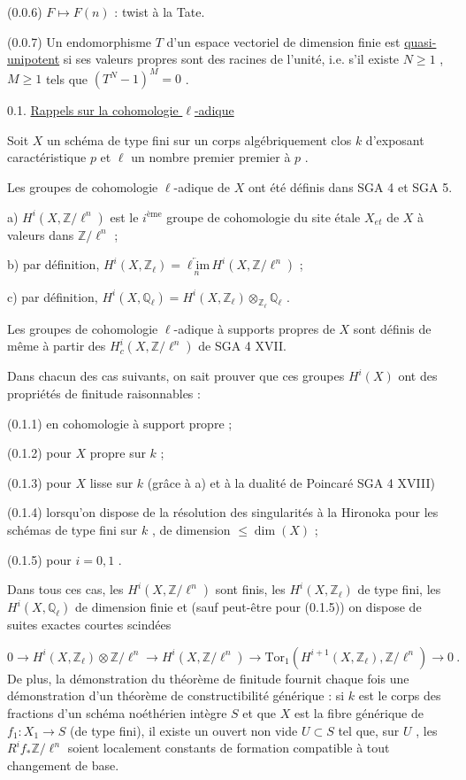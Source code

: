 (0.0.6)    $F \longmapsto F(n)$ : twist à la Tate.

(0.0.7)    Un endomorphisme  $T$  d'un espace vectoriel de dimension finie est \underline{quasi-unipotent} si ses valeurs propres sont des racines de l'unité, i.e. s'il existe $N \geqslant 1$ , $M \geqslant 1$  tels que $(T^N - 1)^M = 0$ .


0.1.  \underline{Rappels sur la cohomologie $\ell$-adique}

Soit  $X$  un schéma de type fini sur un corps algébriquement clos  $k$  d'exposant caractéristique  $p$  et  $\ell$  un nombre premier premier à  $p$ .

Les groupes de cohomologie $\ell$-adique de  $X$  ont été définis dans SGA 4 et SGA 5.

a) $H^i(X,\mathbb{Z}/\ell^n)$  est le $i^{\text{ème}}$ groupe de cohomologie du site étale  $X_{et}$  de  $X$  à valeurs dans  $\mathbb{Z}/\ell^n$ ;

b) par définition,  $H^i(X,\mathbb{Z}_\ell) = \underset{n}{\underleftarrow{\ell\mathrm{im}}}\, H^i(X,\mathbb{Z}/\ell^n)$  ;

c) par définition,  $H^i(X,\mathbb{Q}_\ell) = H^i(X,\mathbb{Z}_\ell) \otimes_{\mathbb{Z}_\ell} \mathbb{Q}_\ell$ .

Les groupes de cohomologie $\ell$-adique à supports propres de  $X$  sont définis de même à partir des  $H^i_c(X,\mathbb{Z}/\ell^n)$  de SGA 4 XVII.

Dans chacun des cas suivants, on sait prouver que ces groupes  $H^i(X)$  ont des propriétés de finitude raisonnables :

(0.1.1)    en cohomologie à support propre ;

(0.1.2)    pour  $X$  propre sur  $k$ ;

(0.1.3)    pour  $X$  lisse sur  $k$ (grâce à  a)  et à la dualité de Poincaré SGA 4 XVIII)

(0.1.4)    lorsqu'on dispose de la résolution des singularités à la Hironoka pour les schémas de type fini sur  $k$ , de dimension $\leqslant \dim(X)$ ;

(0.1.5)    pour  $i = 0, 1$ .



Dans tous ces cas, les  $H^i(X,\mathbb{Z}/\ell^n)$  sont finis, les $H^i(X,\mathbb{Z}_\ell)$  de type fini, les $H^i(X,\mathbb{Q}_\ell)$  de dimension finie et (sauf peut-être pour (0.1.5)) on dispose de suites exactes courtes scindées

\begin{equation*}
0 \longrightarrow H^i(X,\mathbb{Z}_\ell) \otimes \mathbb{Z}/\ell^n \longrightarrow H^i(X,\mathbb{Z}/\ell^n) \longrightarrow \mathrm{Tor}_1(H^{i+1}(X,\mathbb{Z}_\ell),\mathbb{Z}/\ell^n) \longrightarrow 0 \ .
\end{equation*}
De plus, la démonstration du théorème de finitude fournit chaque fois une démonstration d'un théorème de constructibilité générique : si  $k$  est le corps des fractions d'un schéma noéthérien intègre  $S$  et que  $X$  est la fibre générique de  $f_1 : X_1 \longrightarrow S$  (de type fini), il existe un ouvert non vide  $U \subset S$  tel que, sur  $U$ , les $R^i f_* \mathbb{Z}/\ell^n$  soient localement constants de formation compatible à tout changement de base.

